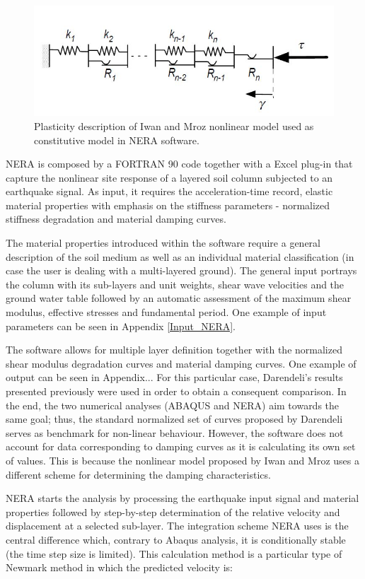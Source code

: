 	\begin{figure}[h!]
		\centering
		\includegraphics[width=0.7\linewidth]{"Mroz"}
		\caption[]{Plasticity description of Iwan and Mroz nonlinear model used as constitutive model in NERA software.}
		\label{Mroz}
	\end{figure}
	
	NERA is composed by a FORTRAN 90 code together with a Excel plug-in that capture the nonlinear site response of a layered soil column subjected to an earthquake signal. As input, it requires the acceleration-time record, elastic material properties with emphasis on the stiffness parameters - normalized stiffness degradation and material damping curves. 
	
	The material properties introduced within the software require a general description of the soil medium as well as an individual material classification (in case the user is dealing with a multi-layered ground). The general input portrays the column with its sub-layers and unit weights, shear wave velocities and the ground water table followed by an automatic assessment of the maximum shear modulus, effective stresses and fundamental period. One example of input parameters can be seen in Appendix \ref{Input_NERA}.
	
	The software allows for multiple layer definition together with the normalized shear modulus degradation curves and material damping curves. One example of output can be seen in Appendix... For this particular case, Darendeli's results presented previously were used in order to obtain a consequent comparison. In the end, the two numerical analyses (ABAQUS and NERA) aim towards the same goal; thus, the standard normalized set of curves proposed by Darendeli serves as benchmark for non-linear behaviour. However, the software does not account for data corresponding to damping curves as it is calculating its own set of values. This is because the nonlinear model proposed by Iwan and Mroz uses a different scheme for determining the damping characteristics.
	
	NERA starts the analysis by processing the earthquake input signal and material properties followed by step-by-step determination of the relative velocity and displacement at a selected sub-layer. The integration scheme NERA uses is the central difference which, contrary to Abaqus analysis, it is conditionally stable (the time step size is limited). This calculation method is a particular type of Newmark method in which the predicted velocity is:
	
